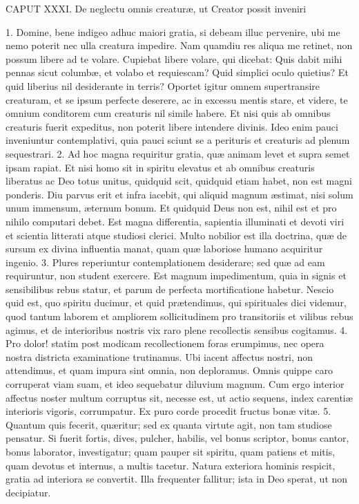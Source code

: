 CAPUT XXXI.
De neglectu omnis creaturæ, ut Creator possit inveniri

1. Domine, bene indigeo adhuc maiori gratia, si debeam illuc pervenire, ubi me nemo poterit nec ulla creatura impedire. Nam quamdiu res aliqua me retinet, non possum libere ad te volare. Cupiebat libere volare, qui dicebat: Quis dabit mihi pennas sicut columbæ, et volabo et requiescam? Quid simplici oculo quietius? Et quid liberius nil desiderante in terris? Oportet igitur omnem supertransire creaturam, et se ipsum perfecte deserere, ac in excessu mentis stare, et videre, te omnium conditorem cum creaturis nil simile habere. Et nisi quis ab omnibus creaturis fuerit expeditus, non poterit libere intendere divinis. Ideo enim pauci inveniuntur contemplativi, quia pauci sciunt se a perituris et creaturis ad plenum sequestrari.
2. Ad hoc magna requiritur gratia, quæ animam levet et supra semet ipsam rapiat. Et nisi homo sit in spiritu elevatus et ab omnibus creaturis liberatus ac Deo totus unitus, quidquid scit, quidquid etiam habet, non est magni ponderis. Diu parvus erit et infra iacebit, qui aliquid magnum æstimat, nisi solum unum immensum, æternum bonum. Et quidquid Deus non est, nihil est et pro nihilo computari debet. Est magna differentia, sapientia illuminati et devoti viri et scientia litterati atque studiosi clerici. Multo nobilior est illa doctrina, quæ de sursum ex divina influentia manat, quam quæ laboriose humano acquiritur ingenio.
3. Plures reperiuntur contemplationem desiderare; sed quæ ad eam requiruntur, non student exercere. Est magnum impedimentum, quia in signis et sensibilibus rebus statur, et parum de perfecta mortificatione habetur. Nescio quid est, quo spiritu ducimur, et quid prætendimus, qui spirituales dici videmur, quod tantum laborem et ampliorem sollicitudinem pro transitoriis et vilibus rebus agimus, et de interioribus nostris vix raro plene recollectis sensibus cogitamus.
4. Pro dolor! statim post modicam recollectionem foras erumpimus, nec opera nostra districta examinatione trutinamus. Ubi iacent affectus nostri, non attendimus, et quam impura sint omnia, non deploramus. Omnis quippe caro corruperat viam suam, et ideo sequebatur diluvium magnum. Cum ergo interior affectus noster multum corruptus sit, necesse est, ut actio sequens, index carentiæ interioris vigoris, corrumpatur. Ex puro corde procedit fructus bonæ vitæ.
5. Quantum quis fecerit, quæritur; sed ex quanta virtute agit, non tam studiose pensatur. Si fuerit fortis, dives, pulcher, habilis, vel bonus scriptor, bonus cantor, bonus laborator, investigatur; quam pauper sit spiritu, quam patiens et mitis, quam devotus et internus, a multis tacetur. Natura exteriora hominis respicit, gratia ad interiora se convertit. Illa frequenter fallitur; ista in Deo sperat, ut non decipiatur.


